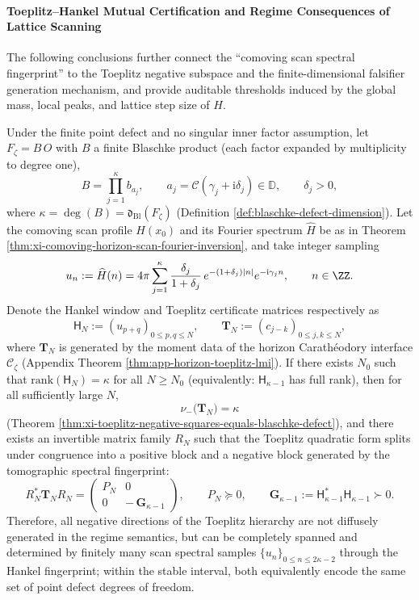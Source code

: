 \paragraph{Toeplitz--Hankel Mutual Certification and Regime Consequences of Lattice Scanning}
The following conclusions further connect the ``comoving scan spectral fingerprint'' to the Toeplitz negative subspace and the finite-dimensional falsifier generation mechanism, and provide auditable thresholds induced by the global mass, local peaks, and lattice step size of \(H\).

\begin{proposition}\label{con:xi-toeplitz-hankel-isomorphic-split}
Under the finite point defect and no singular inner factor assumption, let \(F_{\zeta}=B\,O\) with \(B\) a finite Blaschke product (each factor expanded by multiplicity to degree one),
\[
B=\prod_{j=1}^{\kappa}b_{a_j},
\qquad
a_j=\mathcal{C}(\gamma_j+\mathrm{i}\delta_j)\in\mathbb{D},
\qquad
\delta_j>0,
\]
where \(\kappa=\deg(B)=\mathfrak d_{\mathrm{Bl}}(F_{\zeta})\) (Definition \ref{def:blaschke-defect-dimension}).
Let the comoving scan profile \(H(x_0)\) and its Fourier spectrum \(\widehat H\) be as in Theorem \ref{thm:xi-comoving-horizon-scan-fourier-inversion}, and take integer sampling
\[
u_n:=\widehat H(n)
=4\pi\sum_{j=1}^{\kappa}\frac{\delta_j}{1+\delta_j}\,e^{-(1+\delta_j)|n|}e^{-\mathrm{i}\gamma_j n},
\qquad n\in\ZZ.
\]
Denote the Hankel window and Toeplitz certificate matrices respectively as
\[
\mathsf H_N:=(u_{p+q})_{0\le p,q\le N},
\qquad
\mathbf{T}_N:=(c_{j-k})_{0\le j,k\le N},
\]
where \(\mathbf{T}_N\) is generated by the moment data of the horizon Carath\'eodory interface \(\mathscr{C}_{\zeta}\) (Appendix Theorem \ref{thm:app-horizon-toeplitz-lmi}).
If there exists \(N_0\) such that \(\mathrm{rank}(\mathsf H_N)=\kappa\) for all \(N\ge N_0\) (equivalently: \(\mathsf H_{\kappa-1}\) has full rank), then for all sufficiently large \(N\),
\[
\nu_-\!\bigl(\mathbf{T}_N\bigr)=\kappa
\]
(Theorem \ref{thm:xi-toeplitz-negative-squares-equals-blaschke-defect}), and there exists an invertible matrix family \(R_N\) such that the Toeplitz quadratic form splits under congruence into a positive block and a negative block generated by the tomographic spectral fingerprint:
\[
R_N^{\ast}\mathbf{T}_N R_N
=
\begin{pmatrix}
P_N & 0\\
0 & -\,\mathbf{G}_{\kappa-1}
\end{pmatrix},
\qquad
P_N\succeq 0,
\qquad
\mathbf{G}_{\kappa-1}:=\mathsf H_{\kappa-1}^{\ast}\mathsf H_{\kappa-1}\succ 0.
\]
Therefore, all negative directions of the Toeplitz hierarchy are not diffusely generated in the regime semantics, but can be completely spanned and determined by finitely many scan spectral samples \(\{u_n\}_{0\le n\le 2\kappa-2}\) through the Hankel fingerprint; within the stable interval, both equivalently encode the same set of point defect degrees of freedom.
\end{proposition}


